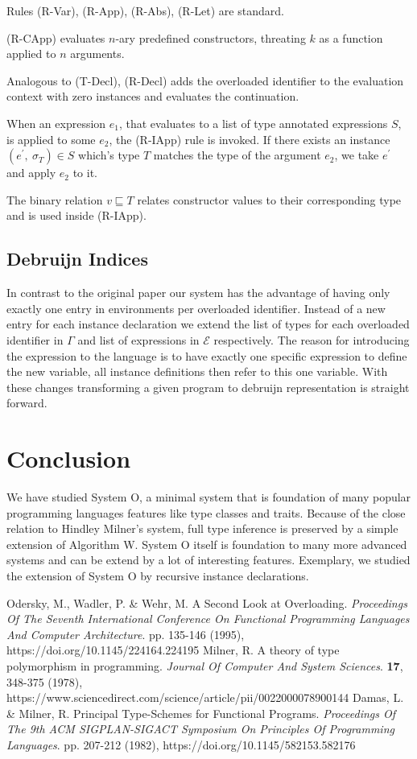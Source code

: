 \documentclass[runningheads]{llncs}
\newcommand{\snip}[1]{\footnotesize{\ttfamily{#1}}}
\begin{document}
\noindent Rules (R-Var), (R-App), (R-Abs), (R-Let) are standard. 

(R-CApp) evaluates $n$-ary predefined constructors, threating $k$ as a function applied to $n$ arguments. 

Analogous to (T-Decl), (R-Decl) adds the overloaded identifier to the evaluation context with zero instances and evaluates the continuation.

When an expression $e_1$, that evaluates to a list of type annotated expressions $S$, is applied to some $e_2$, the (R-IApp) rule is invoked. If there exists an instance $(e^\prime, \ \sigma_T) \in S$ which's type $T$ matches the type of the argument $e_2$, we take $e^\prime$ and apply $e_2$ to it. 

The binary relation $v \sqsubseteq T$ relates constructor values to their corresponding type and is used inside (R-IApp).
\subsection{Debruijn Indices}
In contrast to the original paper our system has the advantage of having only exactly one entry in environments per overloaded identifier. Instead of a new entry for each instance declaration we extend the list of types for each overloaded identifier in $\Gamma$ and list of expressions in $\mathcal{E}$ respectively. The reason for introducing the \snip{decl} expression to the language is to have exactly one specific expression to define the new variable, all instance definitions then refer to this one variable. With these changes transforming a given program to debruijn representation is straight forward.

\section{Conclusion}
We have studied System O, a minimal system that is foundation of many popular programming languages features like type classes and traits. Because of the close relation to Hindley Milner's system, full type inference is preserved by a simple extension of Algorithm W. System O itself is foundation to many more advanced systems and can be extend by a lot of interesting features. Exemplary, we studied the extension of System O by recursive instance declarations.

\begin{thebibliography}{8}

Odersky, M., Wadler, P. \& Wehr, M. A Second Look at Overloading. {\em Proceedings Of The Seventh International Conference On Functional Programming Languages And Computer Architecture}. pp. 135-146 (1995), https://doi.org/10.1145/224164.224195
Milner, R. A theory of type polymorphism in programming. {\em Journal Of Computer And System Sciences}. \textbf{17}, 348-375 (1978), https://www.sciencedirect.com/science/article/pii/0022000078900144
Damas, L. \& Milner, R. Principal Type-Schemes for Functional Programs. {\em Proceedings Of The 9th ACM SIGPLAN-SIGACT Symposium On Principles Of Programming Languages}. pp. 207-212 (1982), https://doi.org/10.1145/582153.582176
\end{thebibliography}
\end{document}
